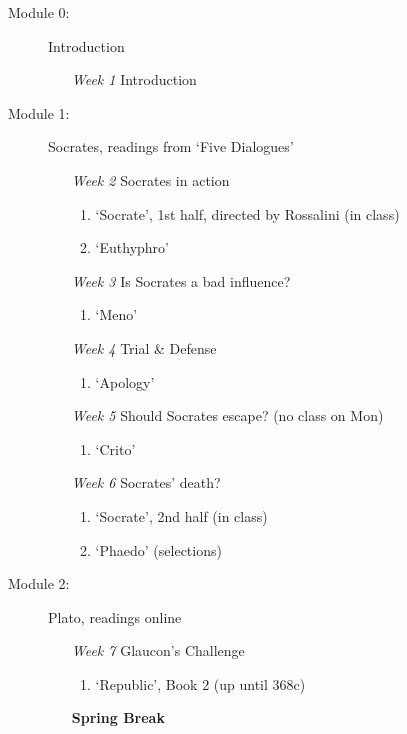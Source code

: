 \documentclass[article,oneside]{memoir}
\begin{document}
\begin{description}
\item[Module 0:] {Introduction}
\begin{enumerate}
\item[\textit{Week 1}] Introduction 
\end{enumerate}

\item[Module 1:] Socrates, readings from `Five Dialogues'
\begin{enumerate}
\item[\textit{Week 2}] Socrates in action
\begin{enumerate}
\item `Socrate', 1st half, directed by Rossalini (in class)
\item `Euthyphro'
\end{enumerate}

\item[ \textit{Week 3}] Is Socrates a bad influence? 
\begin{enumerate}
\item `Meno'
\end{enumerate}

\item[ \textit{Week 4}] Trial \& Defense
\begin{enumerate}
\item `Apology'
\end{enumerate}

\item[ \textit{Week 5}] Should Socrates escape? (no class on Mon)
\begin{enumerate}
\item `Crito'
\end{enumerate}
\item[ \textit{Week 6}] Socrates' death? 
\begin{enumerate}
\item `Socrate', 2nd half (in class) 
\item `Phaedo' (selections)
\end{enumerate}
\end{enumerate}


\item[Module 2:] Plato, readings online
\begin{enumerate}
\item[\textit{Week 7}] Glaucon's Challenge
\begin{enumerate}
\item `Republic', Book 2 (up until 368c) 
\end{enumerate}
\item[\textbf{Spring Break}] \


\end{enumerate}
\end{description}
\end{document}
